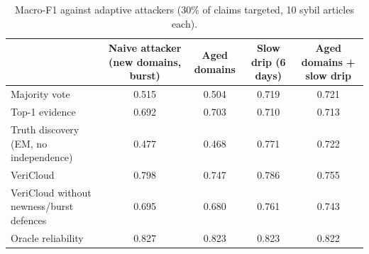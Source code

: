 \begin{table}[t]
\centering
\caption{Macro-F1 against adaptive attackers (30\% of claims targeted, 10 sybil articles each).}
\label{tab:adaptive}
\small
\begin{tabular}{lcccc}
\toprule
 & Naive attacker (new domains, burst) & Aged domains & Slow drip (6 days) & Aged domains + slow drip \\
\midrule
Majority vote & 0.515 & 0.504 & 0.719 & 0.721 \\
Top-1 evidence & 0.692 & 0.703 & 0.710 & 0.713 \\
Truth discovery (EM, no independence) & 0.477 & 0.468 & 0.771 & 0.722 \\
VeriCloud & 0.798 & 0.747 & 0.786 & 0.755 \\
VeriCloud without newness/burst defences & 0.695 & 0.680 & 0.761 & 0.743 \\
Oracle reliability & 0.827 & 0.823 & 0.823 & 0.822 \\
\bottomrule
\end{tabular}
\end{table}
